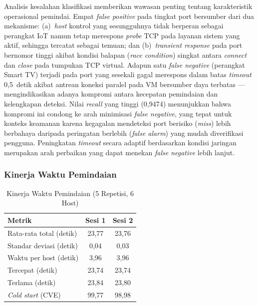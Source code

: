 \documentclass[conference]{IEEEtran}
\begin{document}
Analisis kesalahan klasifikasi memberikan wawasan penting tentang
karakteristik operasional pemindai. Empat \textit{false positive} pada
tingkat port bersumber dari dua mekanisme: (a)~\textit{host} kontrol yang
sesungguhnya tidak berperan sebagai perangkat IoT namun tetap merespons
\textit{probe} TCP pada layanan sistem yang aktif, sehingga tercatat
sebagai temuan; dan (b)~\textit{transient response} pada port bernomor
tinggi akibat kondisi balapan (\textit{race condition}) singkat antara
\textit{connect} dan \textit{close} pada tumpukan TCP virtual. Adapun satu
\textit{false negative} (perangkat Smart TV) terjadi pada port yang
sesekali gagal merespons dalam batas \textit{timeout} 0,5~detik akibat
antrean koneksi paralel pada VM bersumber daya terbatas ---
mengindikasikan adanya kompromi antara kecepatan pemindaian dan
kelengkapan deteksi. Nilai \textit{recall} yang tinggi (0,9474)
menunjukkan bahwa kompromi ini condong ke arah minimisasi \textit{false
negative}, yang tepat untuk konteks keamanan karena kegagalan mendeteksi
port berisiko (\textit{miss}) lebih berbahaya daripada peringatan
berlebih (\textit{false alarm}) yang mudah diverifikasi pengguna.
Peningkatan \textit{timeout} secara adaptif berdasarkan kondisi jaringan
merupakan arah perbaikan yang dapat menekan \textit{false negative} lebih
lanjut.

\subsubsection{Kinerja Waktu Pemindaian}

\begin{table}[htbp]
\caption{Kinerja Waktu Pemindaian (5 Repetisi, 6 Host)}
\label{tab:kecepatan}
\renewcommand{\arraystretch}{1.2}
\begin{tabular}{|l|c|c|}
\hline
\textbf{Metrik} & \textbf{Sesi 1} & \textbf{Sesi 2} \\
\hline
Rata-rata total (detik)  & 23,77 & 23,76 \\
\hline
Standar deviasi (detik)  & 0,04  & 0,03  \\
\hline
Waktu per host (detik)   & 3,96  & 3,96  \\
\hline
Tercepat (detik)         & 23,74 & 23,74 \\
\hline
Terlama (detik)          & 23,84 & 23,80 \\
\hline
\textit{Cold start} (CVE)& 99,77 & 98,98 \\
\hline
\end{tabular}
\end{table}
\end{document}
